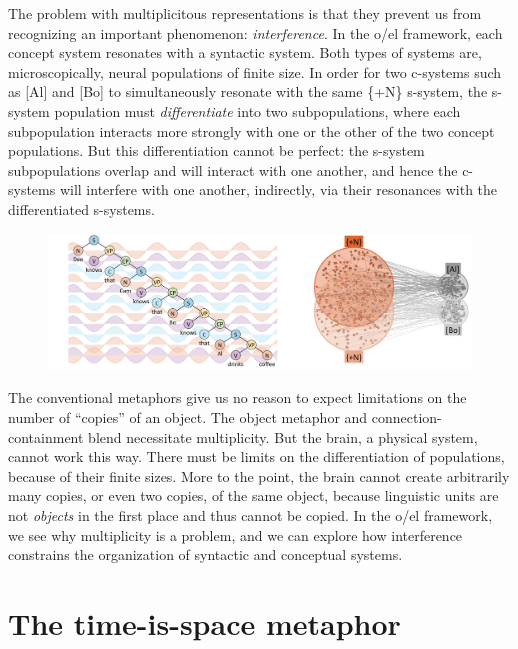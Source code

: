   The problem with multiplicitous representations is that they prevent us from recognizing an important phenomenon: \textit{interference}. In the o/el framework, each concept system resonates with a syntactic system. Both types of systems are, microscopically, neural populations of finite size. In order for two c-systems such as [Al] and [Bo] to simultaneously resonate with the same \{+N\} s-system, the s-system population must \textit{differentiate} into two subpopulations, where each subpopulation interacts more strongly with one or the other of the two concept populations. But this differentiation cannot be perfect: the s-system subpopulations overlap and will interact with one another, and hence the c-systems will interfere with one another, indirectly, via their resonances with the differentiated s-systems. 

  
\begin{figure}
\includegraphics[width=\textwidth]{figures/Tilsen-img37.png}
\caption{\missingcaption}
\label{fig:}
\end{figure}
 

  The conventional metaphors give us no reason to expect limitations on the number of “copies” of an object. The object metaphor and connection-containment blend necessitate multiplicity. But the brain, a physical system, cannot work this way. There must be limits on the differentiation of populations, because of their finite sizes. More to the point, the brain cannot create arbitrarily many copies, or even two copies, of the same object, because linguistic units are not \textit{objects} in the first place and thus cannot be copied. In the o/el framework, we see why multiplicity is a problem, and we can explore how interference constrains the organization of syntactic and conceptual systems.

\section{The time-is-space metaphor}

